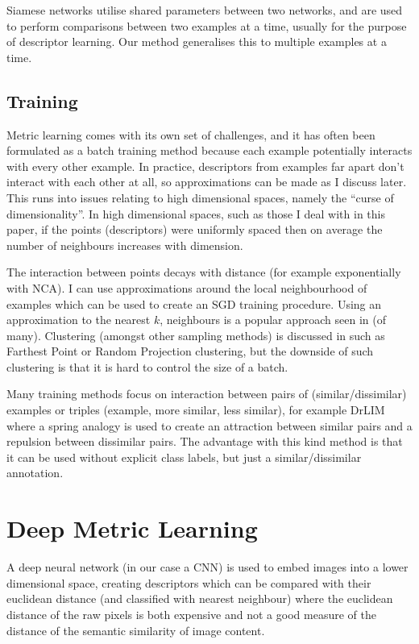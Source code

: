 Siamese networks utilise shared parameters between two networks, and are used to perform comparisons between two examples at a time, usually for the purpose of descriptor learning. Our method generalises this to multiple examples at a time.

\subsection {Training}

Metric learning comes with its own set of challenges, and it has often been formulated as a batch training method because each example potentially interacts with every other example. In practice, descriptors from examples far apart don't interact with each other at all, so approximations can be made as I discuss later. This runs into issues relating to high dimensional spaces, namely the ``curse of dimensionality''. In high dimensional spaces, such as those I deal with in this paper, if the points (descriptors) were uniformly spaced then on average the number of neighbours increases with dimension. 

The interaction between points decays with distance (for example exponentially with \gls{NCA}). I can use approximations around the local neighbourhood of examples which can be used to create an \gls{SGD} training procedure. Using an approximation to the nearest $ k $, neighbours is a popular approach seen in \cite{Mensink2012,Zaidi2011} (of many). Clustering (amongst other sampling methods) is discussed in  \cite{Oneat2011} such as Farthest Point or Random Projection clustering, but the downside of such clustering is that it is hard to control the size of a batch. 

Many training methods focus on interaction between pairs of (similar/dissimilar) examples or triples (example, more similar, less similar), for example DrLIM \cite{Hadsell2006} where a spring analogy is used to create an attraction between similar pairs and a repulsion between dissimilar pairs. The advantage with this kind method is that it can be used without explicit class labels, but just a similar/dissimilar annotation.

\section {Deep Metric Learning}

A deep neural network (in our case a \gls{CNN}) is used to embed images into a lower dimensional space, creating descriptors which can be compared with their euclidean distance (and classified with nearest neighbour) where the euclidean distance of the raw pixels is both expensive and not a good measure of the distance of the semantic similarity of image content. 


